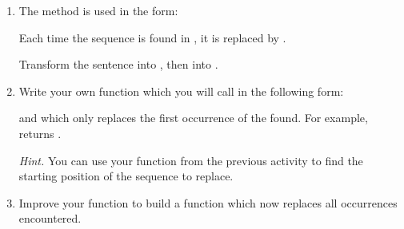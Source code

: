 \documentclass[11pt,class=report,crop=false]{standalone}
\begin{document}

\begin{activite}[Replace]


\begin{enumerate}
  \item The  method is used in the form:

	
	Each time the sequence  is found in , it is replaced by .
	
	Transform the sentence  into , then into .
	
	\item Write your own  function which you will call in the following form:	
  
 and which only replaces the first occurrence of the  found. For example,  returns .
  
  
  \emph{Hint.} You can use your  function from the previous activity to find the starting position of the sequence to replace.
  
 	\item Improve your function to build a  function which now replaces all occurrences encountered.
 	    
\end{enumerate}    
\end{activite}

\end{document}
